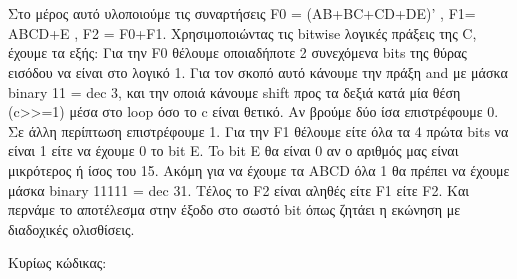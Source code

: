 \section{}
Στο μέρος αυτό υλοποιούμε τις συναρτήσεις F0 = (AB+BC+CD+DE)' , F1= ABCD+E , F2 = F0+F1.
Χρησιμοποιώντας τις bitwise λογικές πράξεις της C, έχουμε τα εξής:
Για την F0 θέλουμε οποιαδήποτε 2 συνεχόμενα bits της θύρας εισόδου να είναι στο λογικό 1.
Για τον σκοπό αυτό κάνουμε την πράξη and με μάσκα binary 11 = dec 3, και την οποιά κάνουμε shift προς τα δεξιά κατά μία θέση (c>>=1)
μέσα στο loop όσο το c είναι θετικό. Αν βρούμε δύο ίσα επιστρέφουμε 0. Σε άλλη περίπτωση επιστρέφουμε 1.
Για την F1 θέλουμε είτε όλα τα 4 πρώτα bits να είναι 1 είτε να έχουμε 0 το bit E. To bit E θα είναι 0 αν ο αριθμός μας είναι μικρότερος ή ίσος του 15.
Ακόμη για να έχουμε τα ABCD όλα 1 θα πρέπει να έχουμε μάσκα binary 11111 = dec 31.
Τέλος το F2 είναι αληθές είτε  F1 είτε F2. Και περνάμε το αποτέλεσμα στην έξοδο  στο σωστό bit όπως ζητάει η εκώνηση με διαδοχικές ολισθίσεις.

\noindent Κυρίως κώδικας:
\inputminted[linenos,obeytabs,fontsize=\footnotesize]{c}{files/part2.c}
